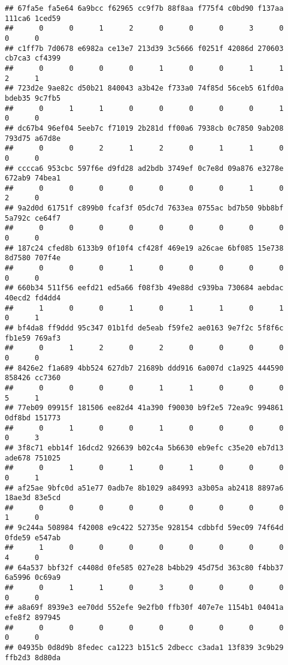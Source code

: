 \documentclass[
]{article}
\begin{document}
\begin{verbatim}
## 67fa5e fa5e64 6a9bcc f62965 cc9f7b 88f8aa f775f4 c0bd90 f137aa 111ca6 1ced59 
##      0      0      1      2      0      0      0      3      0      0      0 
## c1ff7b 7d0678 e6982a ce13e7 213d39 3c5666 f0251f 42086d 270603 cb7ca3 cf4399 
##      0      0      0      0      1      0      0      1      1      2      1 
## 723d2e 9ae82c d50b21 840043 a3b42e f733a0 74f85d 56ceb5 61fd0a bdeb35 9c7fb5 
##      0      1      1      0      0      0      0      0      1      0      0 
## dc67b4 96ef04 5eeb7c f71019 2b281d ff00a6 7938cb 0c7850 9ab208 793d75 a67d8e 
##      0      0      2      1      2      0      1      1      0      0      0 
## cccca6 953cbc 597f6e d9fd28 ad2bdb 3749ef 0c7e8d 09a876 e3278e 672ab9 74bea1 
##      0      0      0      0      0      0      0      1      0      2      0 
## 9a2d0d 61751f c899b0 fcaf3f 05dc7d 7633ea 0755ac bd7b50 9bb8bf 5a792c ce64f7 
##      0      0      0      0      0      0      0      0      0      0      0 
## 187c24 cfed8b 6133b9 0f10f4 cf428f 469e19 a26cae 6bf085 15e738 8d7580 707f4e 
##      0      0      0      1      0      0      0      0      0      0      0 
## 660b34 511f56 eefd21 ed5a66 f08f3b 49e88d c939ba 730684 aebdac 40ecd2 fd4dd4 
##      1      0      0      1      0      1      1      0      1      0      1 
## bf4da8 ff9ddd 95c347 01b1fd de5eab f59fe2 ae0163 9e7f2c 5f8f6c fb1e59 769af3 
##      0      1      2      0      2      0      0      0      0      0      0 
## 8426e2 f1a689 4bb524 627db7 21689b ddd916 6a007d c1a925 444590 858426 cc7360 
##      0      0      0      0      1      1      0      0      0      5      1 
## 77eb09 09915f 181506 ee82d4 41a390 f90030 b9f2e5 72ea9c 994861 0df8bd 151773 
##      0      1      0      0      1      0      0      0      0      0      3 
## 3f8c71 ebb14f 16dcd2 926639 b02c4a 5b6630 eb9efc c35e20 eb7d13 ade678 751025 
##      0      1      0      1      0      1      0      0      0      0      1 
## af25ae 9bfc0d a51e77 0adb7e 8b1029 a84993 a3b05a ab2418 8897a6 18ae3d 83e5cd 
##      0      0      0      0      0      0      0      0      0      1      0 
## 9c244a 508984 f42008 e9c422 52735e 928154 cdbbfd 59ec09 74f64d 0fde59 e547ab 
##      1      0      0      0      0      0      0      0      0      4      0 
## 64a537 bbf32f c4408d 0fe585 027e28 b4bb29 45d75d 363c80 f4bb37 6a5996 0c69a9 
##      0      1      1      0      3      0      0      0      0      0      0 
## a8a69f 8939e3 ee70dd 552efe 9e2fb0 ffb30f 407e7e 1154b1 04041a efe8f2 897945 
##      0      0      0      0      0      0      0      0      0      0      0 
## 04935b 0d8d9b 8fedec ca1223 b151c5 2dbecc c3ada1 13f839 3c9b29 ffb2d3 8d80da 

\end{verbatim}
\end{document}
